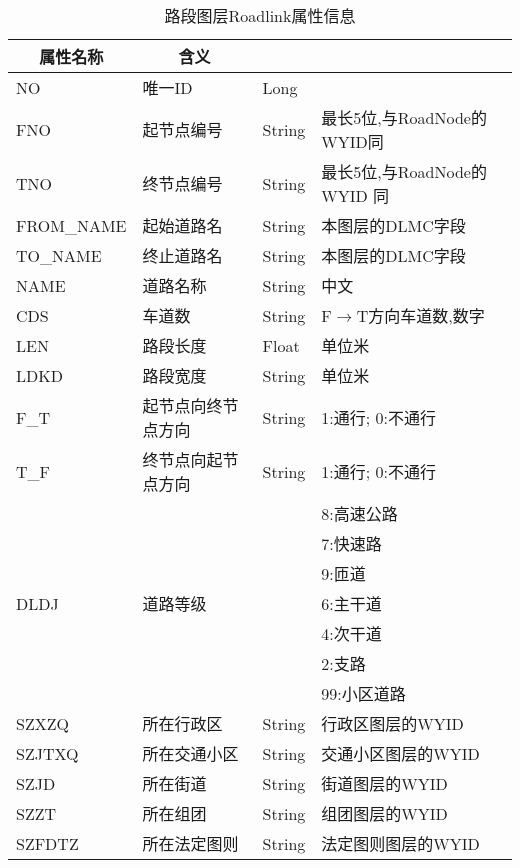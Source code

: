 \renewcommand{\arraystretch}{0.8}
\begin{longtable}[c] {|m{}|m{}|>{\centering\arraybackslash}m{}|
>{\baselineskip=14pt}m{}|} 
\caption{路段图层Roadlink属性信息\label{tbl:路段图层Roadlink属性信息}}
\hline
\multicolumn{1}{|c|}{\bfseries 属性名称} & \multicolumn{1}{c|}{\bfseries 含义} & 
  \multicolumn{1}{c|}{\bfseries 类型} & \multicolumn{1}{c|}{\bfseries 说明}\\\hline

NO & 唯一ID & Long & \\\hline
FNO & 起节点编号 & String & 最长5位,与RoadNode的WYID同 \\\hline
TNO & 终节点编号 & String & 最长5位,与RoadNode的WYID 同 \\\hline
FROM\_NAME & 起始道路名 & String & 本图层的DLMC字段 \\\hline
TO\_NAME & 终止道路名 & String & 本图层的DLMC字段 \\\hline
NAME & 道路名称 & String & 中文 \\\hline
CDS & 车道数 & String & F$\rightarrow$T方向车道数,数字\\\hline
LEN & 路段长度 & Float & 单位米\\\hline
LDKD & 路段宽度 & String & 单位米\\\hline
F\_T & 起节点向终节点方向 & String & 1:通行; 0:不通行\\\hline
T\_F & 终节点向起节点方向 & String & 1:通行; 0:不通行\\\hline
\multirow{7}{*}{DLDJ} & \multirow{7}{*}{道路等级} & \multirow{7}{*}{String} & 8:高速公路\\
& & & 7:快速路 \\
& & & 9:匝道 \\
& & & 6:主干道 \\
& & & 4:次干道 \\
& & & 2:支路 \\
& & & 99:小区道路\\\hline
SZXZQ & 所在行政区 & String & 行政区图层的WYID \\\hline
SZJTXQ & 所在交通小区 & String & 交通小区图层的WYID \\\hline
SZJD & 所在街道 & String & 街道图层的WYID \\\hline
SZZT & 所在组团 & String & 组团图层的WYID \\\hline
SZFDTZ & 所在法定图则 & String & 法定图则图层的WYID \\\hline
\end{longtable}

